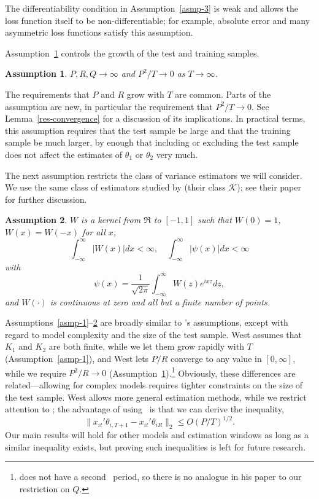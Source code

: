 \documentclass[11pt]{article}
\newtheorem{asmp}{Assumption}
\newcommand{\citepos}[1]{\citeauthor{#1}'s \citeyearpar{#1}}
\begin{document}
The differentiability condition in Assumption~\ref{asmp-3} is weak and
allows the loss function itself to be non-differentiable; for example,
absolute error and many asymmetric loss functions satisfy this
assumption.

Assumption~\ref{asmp-4} controls the growth of the test and training
samples.
\begin{asmp} \label{asmp-4} $P, R, Q \to\infty$ and $P^2/T \to 0$ as
  $T \to \infty$.
\end{asmp}

The requirements that $P$ and $R$ grow with $T$ are common. Parts of
the assumption are new, in particular the requirement that $P^2/T \to
0$.  See Lemma~\ref{res-convergence} for a discussion of its
implications.  In practical terms, this assumption requires that the
test sample be large and that the training sample be much larger, by
enough that including or excluding the test sample does not affect the
estimates of $\theta_1$ or $\theta_2$ very much.

The next assumption restricts the class of variance estimators we will
consider.  We use the same class of estimators studied by
\citet{JoD:00} (their class $\mathcal{K}$); see
their paper for further discussion.

\begin{asmp}
  \label{asmp-5} $W$ is a kernel from
$\Re$ to $[-1,1]$ such that $W(0) = 1$, $W(x) = W(-x)$ for all $x$,
\begin{equation*}
  \int_{-\infty}^{\infty} \lvert W(x) \rvert dx < \infty, \quad
  \int_{-\infty}^{\infty} \lvert \psi(x) \rvert dx < \infty
\end{equation*}
with
\begin{equation*}
  \psi(x) = \frac1{\sqrt{2\pi}} \int_{-\infty}^{\infty} W(z) e^{ixz}dz,
\end{equation*}
and $W(\cdot)$ is continuous at zero and all but a finite number of
points.
\end{asmp}

Assumptions~\ref{asmp-1}--\ref{asmp-5} are broadly similar to
\citepos{Wes:96} assumptions, except with regard to model complexity
and the size of the test sample.  West assumes that $K_1$ and $K_2$
are both finite, while we let them grow rapidly with $T$
(Assumption~\ref{asmp-1}), and West lets $P/R$ converge to any value
in $[0,\infty]$, while we require $P^2/R \to 0$
(Assumption~\ref{asmp-4}).\footnote{\citet{Wes:96} does not have a
  second \oos\ period, so there is no analogue in his paper to our
  restriction on $Q$.}  Obviously, these differences are
related---allowing for complex models requires tighter constraints on
the size of the test sample.  West allows more general estimation
methods, while we restrict attention to \ols; the advantage of using
\ols\ is that we can derive the inequality,
\begin{equation*}
  \| x_{it}'\theta_{i,T+1} - x_{it}'\theta_{iR} \|_2 \leq O(P/T)^{1/2}.
\end{equation*}
Our main results will hold for other models and estimation windows as
long as a similar inequality exists, but proving such inequalities is
left for future research.
\end{document}
